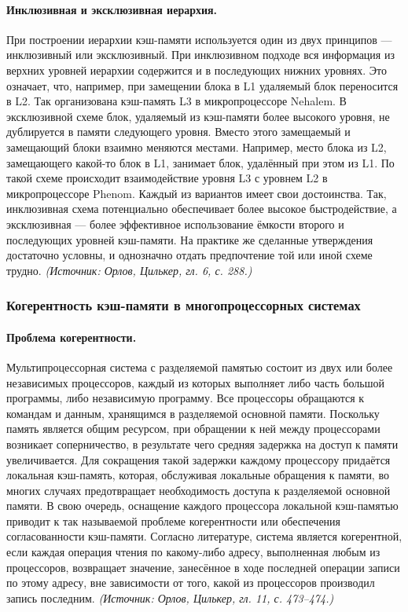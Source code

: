 \documentclass[a4paper,12pt]{article}
\begin{document}
\paragraph{Инклюзивная и эксклюзивная иерархия.}
При построении иерархии кэш-памяти используется один из двух принципов --- инклюзивный или эксклюзивный. При инклюзивном подходе вся информация из верхних уровней иерархии содержится и в последующих нижних уровнях. Это означает, что, например, при замещении блока в L1 удаляемый блок переносится в L2. Так организована кэш-память L3 в микропроцессоре Nehalem. В эксклюзивной схеме блок, удаляемый из кэш-памяти более высокого уровня, не дублируется в памяти следующего уровня. Вместо этого замещаемый и замещающий блоки взаимно меняются местами. Например, место блока из L2, замещающего какой-то блок в L1, занимает блок, удалённый при этом из L1. По такой схеме происходит взаимодействие уровня L3 с уровнем L2 в микропроцессоре Phenom. Каждый из вариантов имеет свои достоинства. Так, инклюзивная схема потенциально обеспечивает более высокое быстродействие, а эксклюзивная --- более эффективное использование ёмкости второго и последующих уровней кэш-памяти. На практике же сделанные утверждения достаточно условны, и однозначно отдать предпочтение той или иной схеме трудно.
\textit{(Источник: Орлов, Цилькер, гл. 6, с. 288.)}

\subsubsection{Когерентность кэш-памяти в многопроцессорных системах}

\paragraph{Проблема когерентности.}
Мультипроцессорная система с разделяемой памятью состоит из двух или более независимых процессоров, каждый из которых выполняет либо часть большой программы, либо независимую программу. Все процессоры обращаются к командам и данным, хранящимся в разделяемой основной памяти. Поскольку память является общим ресурсом, при обращении к ней между процессорами возникает соперничество, в результате чего средняя задержка на доступ к памяти увеличивается. Для сокращения такой задержки каждому процессору придаётся локальная кэш-память, которая, обслуживая локальные обращения к памяти, во многих случаях предотвращает необходимость доступа к разделяемой основной памяти. В свою очередь, оснащение каждого процессора локальной кэш-памятью приводит к так называемой проблеме когерентности или обеспечения согласованности кэш-памяти. Согласно литературе, система является когерентной, если каждая операция чтения по какому-либо адресу, выполненная любым из процессоров, возвращает значение, занесённое в ходе последней операции записи по этому адресу, вне зависимости от того, какой из процессоров производил запись последним.
\textit{(Источник: Орлов, Цилькер, гл. 11, с. 473--474.)}
\end{document}

